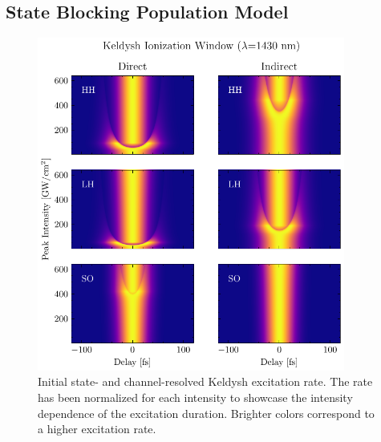 \subsection{State Blocking Population Model}
\label{sec:SB_population_model}

\begin{figure}
	\centering
	\includegraphics[width=0.9\textwidth]{figures/chap4/Keldysh_SingleInt_IonizationWindow.pdf}
	\caption{Initial state- and channel-resolved Keldysh excitation rate. The rate has been normalized for each intensity to showcase the intensity dependence of the excitation duration. Brighter colors correspond to a higher excitation rate.}
	\label{fig:Keldysh_SingleInt_IonizationWindow}
\end{figure}

